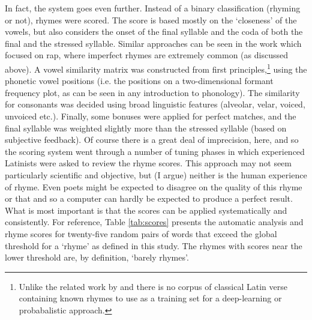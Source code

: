 \documentclass[twocolumn, switch]{article} %
\begin{document}
In fact, the system goes even further. Instead of a binary classification
(rhyming or not), rhymes were scored. The score is based mostly on the
`closeness' of the vowels, but also considers the onset of the final syllable
and the coda of both the final and the stressed syllable. Similar approaches
can be seen in the work which focused on rap, where imperfect rhymes are
extremely common (as discussed above). A vowel similarity matrix was
constructed from first principles,\footnote{
  Unlike the related work by  and
   there is no corpus of classical Latin verse
  containing known rhymes to use as a training set for a deep-learning or
  probabalistic approach.
}
using the phonetic vowel positions (i.e. the positions on a two-dimensional
formant frequency plot, as can be seen in any introduction to phonology). The
similarity for consonants was decided using broad linguistic features
(alveolar, velar, voiced, unvoiced etc.). Finally, some bonuses were applied
for perfect matches, and the final syllable was weighted slightly more than
the stressed syllable (based on subjective feedback). Of course there is a
great deal of imprecision, here, and so the scoring system went through a
number of tuning phases in which experienced Latinists were asked to review
the rhyme scores. This approach may not seem particularly scientific and
objective, but (I argue) neither is the human experience of rhyme. Even poets
might be expected to disagree on the quality of this rhyme or that and so a
computer can hardly be expected to produce a perfect result. What is most
important is that the scores can be applied systematically and consistently.
For reference, Table \ref{tab:scores} presents the automatic analysis and
rhyme scores for twenty-five random pairs of words that exceed the global
threshold for a `rhyme' as defined in this study. The rhymes with scores near
the lower threshold are, by definition, `barely rhymes'.
\end{document}
